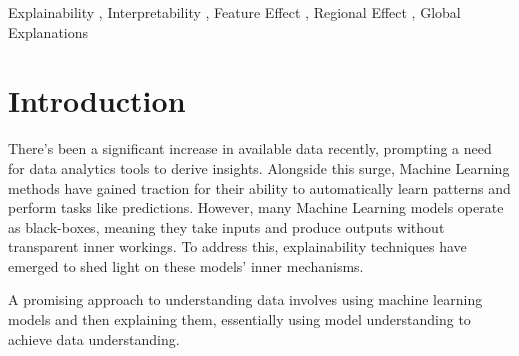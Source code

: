 \documentclass[
twocolumn,
]{ceurart}
\begin{document}
\begin{keywords}
  Explainability \sep
  Interpretability \sep
  Feature Effect \sep
  Regional Effect \sep
  Global Explanations
\end{keywords}

\maketitle

\section{Introduction}
\label{sec:introduction}



There's been a significant increase in available data recently, prompting a need for data analytics tools to derive insights. Alongside this surge, Machine Learning methods have gained traction for their ability to automatically learn patterns and perform tasks like predictions. However, many Machine Learning models operate as black-boxes, meaning they take inputs and produce outputs without transparent inner workings. To address this, explainability techniques have emerged to shed light on these models' inner mechanisms.

A promising approach to understanding data involves using machine learning models and then explaining them, essentially using model understanding to achieve data understanding.



\end{document}
